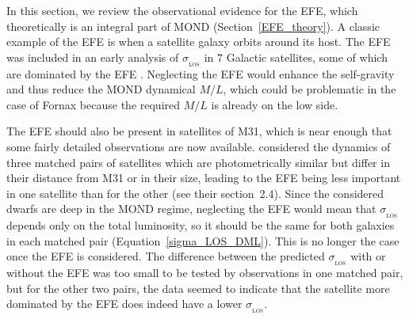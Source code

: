 \documentclass[fleqn,usenatbib,useAMS]{mnras} %
\begin{document}
In this section, we review the observational evidence for the EFE, which theoretically is an integral part of MOND (Section~\ref{EFE_theory}). A classic example of the EFE is when a satellite galaxy orbits around its host. The EFE was included in an early analysis of $\sigma_{_\text{LOS}}$ in 7 Galactic satellites, some of which are dominated by the EFE \citep{Milgrom_1995}. Neglecting the EFE would enhance the self-gravity and thus reduce the MOND dynamical $M/L$, which could be problematic in the case of Fornax because the required $M/L$ is already on the low side.

The EFE should also be present in satellites of M31, which is near enough that some fairly detailed observations are now available. \citet{McGaugh_2013b} considered the dynamics of three matched pairs of satellites which are photometrically similar but differ in their distance from M31 or in their size, leading to the EFE being less important in one satellite than for the other (see their section~2.4). Since the considered dwarfs are deep in the MOND regime, neglecting the EFE would mean that $\sigma_{_\text{LOS}}$ depends only on the total luminosity, so it should be the same for both galaxies in each matched pair (Equation~\ref{sigma_LOS_DML}). This is no longer the case once the EFE is considered. The difference between the predicted $\sigma_{_\text{LOS}}$ with or without the EFE was too small to be tested by observations in one matched pair, but for the other two pairs, the data seemed to indicate that the satellite more dominated by the EFE does indeed have a lower $\sigma_{_\text{LOS}}$.
\end{document}
